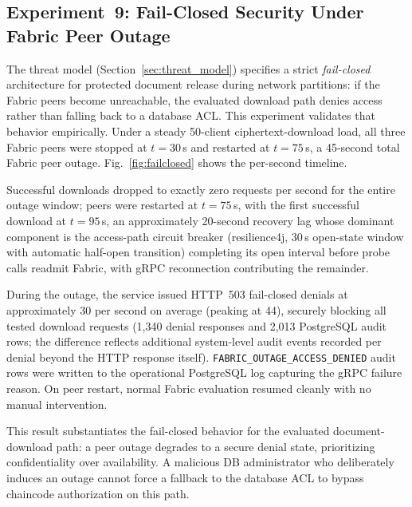 \documentclass[preprint,12pt]{elsarticle}
\begin{document}
\subsection{Experiment~9: Fail-Closed Security Under Fabric Peer Outage}
\label{sec:exp_failclosed}

The threat model (Section~\ref{sec:threat_model}) specifies a strict \emph{fail-closed} architecture for protected document release during network partitions: if the Fabric peers become unreachable, the evaluated download path denies access rather than falling back to a database ACL. This experiment validates that behavior empirically. Under a steady 50-client ciphertext-download load, all three Fabric peers were stopped at $t = 30$\,s and restarted at $t = 75$\,s, a 45-second total Fabric peer outage. Fig.~\ref{fig:failclosed} shows the per-second timeline.

Successful downloads dropped to exactly zero requests per second for the entire outage window; peers were restarted at $t = 75$\,s, with the first successful download at $t = 95$\,s, an approximately 20-second recovery lag whose dominant component is the access-path circuit breaker (resilience4j, 30\,s open-state window with automatic half-open transition) completing its open interval before probe calls readmit Fabric, with gRPC reconnection contributing the remainder.

During the outage, the service issued HTTP~503 fail-closed denials at approximately 30 per second on average (peaking at 44), securely blocking all tested download requests (1,340 denial responses and 2,013 \mbox{PostgreSQL} audit rows; the difference reflects additional system-level audit events recorded per denial beyond the HTTP response itself). \texttt{FABRIC\_OUTAGE\_ACCESS\_DENIED} audit rows were written to the operational \mbox{PostgreSQL} log capturing the gRPC failure reason. On peer restart, normal Fabric evaluation resumed cleanly with no manual intervention.

This result substantiates the fail-closed behavior for the evaluated document-download path: a peer outage degrades to a secure denial state, prioritizing confidentiality over availability. A malicious DB administrator who deliberately induces an outage cannot force a fallback to the database ACL to bypass chaincode authorization on this path.
\end{document}
